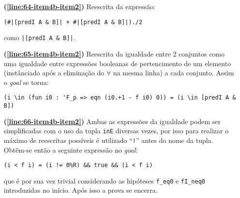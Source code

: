 \begin{enumerate}[label=\textbf{\roman*.}]
\begin{enumerate}[label=\textbf{\roman{enumi}.(\alph*)}]
\begin{enumerate}[label=\textbf{(\alph{enumii}.\arabic*)}]
\begin{enumerate}[listparindent=\parindent]
                                \item[\textbf{(\ref{line:64-item4b-item2})}] Reescrita da expressão:
                                        
                                        \begin{lstlisting}[language=coq,frame=single,tabsize=1]
(#|[predI A & B]| + #|[predI A & B]|)./2
                                        \end{lstlisting}
                                como \lstinline[language=coq]!|[predI A & B]|!.
                                
                                \item[\textbf{(\ref{line:65-item4b-item2})}] Reescrita da igualdade entre 2 conjuntos como uma igualdade entre expressões booleanas de pertencimento de um elemento (instânciado após a eliminação do $\forall$ na mesma linha) a cada conjunto. Assim o \textit{goal} se torna:
                                
                                        \begin{lstlisting}[language=coq,frame=single,tabsize=1]
(i \in (fun i0 : 'F_p => eqn (i0.+1 - f i0) 0)) = (i \in [predI A & B])
                                        \end{lstlisting}

                                \item[\textbf{(\ref{line:66-item4b-item2})}] Ambas as expressões da igualdade podem ser simplificadas com o uso da tupla \lstinline[language=coq]|inE| diversas vezes, por isso para realizar o máximo de reescritas possíveis é utilizado ``\lstinline[language=coq]|!|'' antes do nome da tupla. Obtêm-se então a seguinte expressão no \textit{goal}:
                                
                                        \begin{lstlisting}[language=coq,frame=single,tabsize=1]
(i < f i) = (i != 0%R) && true && (i < f i)
                                        \end{lstlisting}
                                que é por sua vez trivial considerando as hipóteses \lstinline[language=coq]|f_eq0| e \lstinline[language=coq]|fI_neq0| introduzidas no início. Após isso a prova se encerra.
                                
                        \end{enumerate}

                \end{enumerate}


\end{enumerate}
\end{enumerate}
